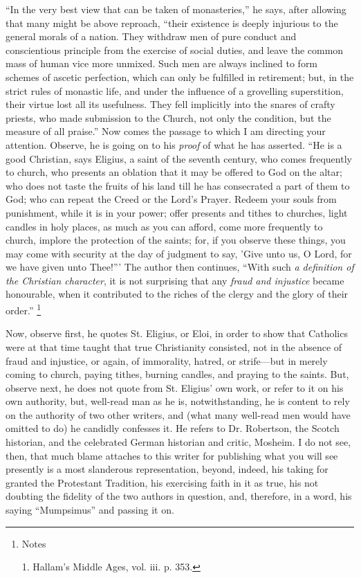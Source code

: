 ``In the very best view that can be taken of
monasteries,'' he says, after allowing that many
might be above reproach, ``their existence is deeply
injurious to the general morals of a nation. They
withdraw men of pure conduct and conscientious principle
from the exercise of social duties, and leave the common
mass of human vice more unmixed. Such men are always
inclined to form schemes of ascetic perfection, which can
only be fulfilled in retirement; but, in the strict rules
of monastic life, and under the influence of a grovelling
superstition, their virtue lost all its usefulness. They
fell implicitly into the snares of crafty priests, who
made submission to the Church, not only the condition,
but the measure of all praise.'' Now comes the
passage to which I am directing your attention. Observe,
he is going on to his \emph{proof} of what he has
asserted. ``He is a good Christian, says Eligius, a
saint of the seventh century, who comes frequently to
church, who presents an oblation that it may be offered
to God on the altar; who does not taste the fruits of his
land till he has consecrated a part of them to God; who
can repeat the Creed or the Lord's Prayer. Redeem your
souls from punishment, while it is in your power; offer
presents and tithes to churches, light candles in holy
places, as much as you can afford, come more frequently
to church, implore the protection of the saints; for, if
you observe these things, you may come with security at
the day of judgment to say, 'Give unto us, O Lord, for we
have given unto Thee!''' The author then continues,
``With such \emph{a definition of the Christian
character}, it is not surprising that any \emph{fraud
and injustice} became honourable, when it contributed
to the riches of the clergy and the glory of their
order.'' \footnote{Notes

1. Hallam's Middle Ages, vol. iii. p. 353.}

Now, observe first, he quotes St. Eligius, or Eloi, in
order to show that Catholics were at that time taught
that true Christianity consisted, not in the absence of
fraud and injustice, or again, of immorality, hatred, or
strife—but in merely coming to church, paying
tithes, burning candles, and praying to the saints. But,
observe next, he does not quote from St. Eligius' own
work, or refer to it on his own authority, but, well-read
man as he is, notwithstanding, he is content to rely on
the authority of two other writers, and (what many
well-read men would have omitted to do) he candidly
confesses it. He refers to Dr. Robertson, the Scotch
historian, and the celebrated German historian and
critic, Mosheim. I do not see, then, that much blame
attaches to this writer for publishing what you will see
presently is a most slanderous representation, beyond,
indeed, his taking for granted the Protestant Tradition,
his exercising faith in it as true, his not doubting the
fidelity of the two authors in question, and, therefore,
in a word, his saying ``Mumpsimus'' and passing
it on.

